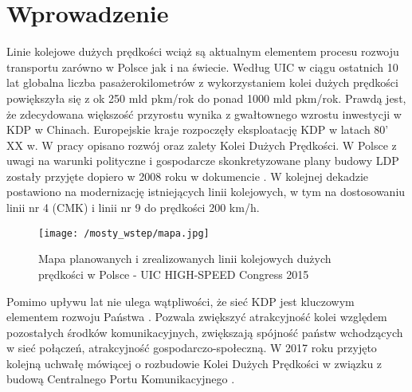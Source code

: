 
\chapter*{Wprowadzenie}

Linie kolejowe dużych prędkości wciąż są aktualnym elementem procesu rozwoju transportu zarówno w Polsce jak i na świecie. Według UIC w ciągu ostatnich 10 lat globalna liczba pasażerokilometrów z wykorzystaniem kolei dużych prędkości powiększyła się z ok 250 mld pkm/rok do ponad 1000 mld pkm/rok. Prawdą jest, że zdecydowana większość przyrostu wynika z gwałtownego wzrostu inwestycji w KDP w Chinach. Europejskie kraje rozpoczęły eksploatację KDP w latach 80' XX w. W pracy \parencite{Towpik2010} opisano rozwój oraz zalety Kolei Dużych Prędkości. W Polsce z uwagi na warunki polityczne i gospodarcze skonkretyzowane plany budowy LDP zostały przyjęte dopiero w 2008 roku w dokumencie \parencite{UchwaaNr276}. W kolejnej dekadzie postawiono na modernizację istniejących linii kolejowych, w tym na dostosowaniu linii nr 4 (CMK) i linii nr 9 do prędkości 200 km/h. 

\begin{figure}[hbt!]
	\centering
	\texttt{[image: /mosty\_wstep/mapa.jpg]}
	\captionsetup{justification=centering}
	\caption{Mapa planowanych i zrealizowanych linii kolejowych dużych prędkości w Polsce - UIC HIGH-SPEED Congress 2015 \parencite{UIC2015}}
	\label{fig:LDP_mapa}
\end{figure}

Pomimo upływu lat nie ulega wątpliwości, że sieć KDP jest kluczowym elementem rozwoju Państwa \parencite{Raczynski2010}. Pozwala zwiększyć atrakcyjność kolei względem pozostałych środków komunikacyjnych, zwiększają spójność państw wchodzących w sieć połączeń, atrakcyjność gospodarczo-społeczną. W 2017 roku przyjęto kolejną uchwałę mówiącej o rozbudowie Kolei Dużych Prędkości w związku z budową Centralnego Portu Komunikacyjnego \parencite{UchwaaNr173}. 


